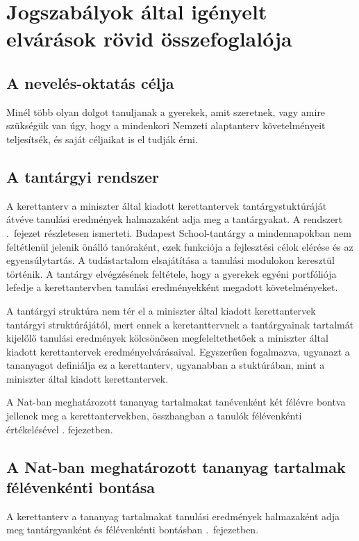 \chapter{Jogszabályok által igényelt elvárások rövid összefoglalója}
\label{sec:jogszabalyok}
\section{A nevelés-oktatás célja}

Minél több olyan dolgot tanuljanak a gyerekek, amit szeretnek, vagy amire szükségük van úgy, hogy a mindenkori Nemzeti alaptanterv követelményeit teljesítsék, és saját céljaikat is el tudják érni.

\section{A tantárgyi rendszer}

A kerettanterv a miniszter által kiadott kerettantervek tantárgystuktúráját átvéve tanulási eredmények halmazaként adja meg a tantárgyakat. A rendszert .~fejezet részletesen ismerteti.  Budapest School-tantárgy a mindennapokban nem feltétlenül jelenik önálló tanóraként, ezek funkciója a fejlesztési célok elérése és az egyensúlytartás. A tudástartalom elsajátítása a tanulási modulokon keresztül történik. A tantárgy elvégzésének feltétele, hogy  a gyerekek egyéni portfóliója lefedje a kerettantervben tanulási eredményekként megadott követelményeket.

A tantárgyi struktúra nem tér el a miniszter által kiadott kerettantervek tantárgyi struktúrájától, mert ennek a keretanttervnek a tantárgyainak tartalmát kijelőlő tanulási eredmények kölcsönösen megfeleltethetőek a miniszter által kiadott kerettantervek eredményelvárásaival. Egyszerűen fogalmazva, ugyanazt a tananyagot definiálja ez a kerettanterv, ugyanabban a stuktúrában, mint a miniszter által kiadott kerettantervek. 

A Nat-ban meghatározott tananyag tartalmakat tanévenként két félévre bontva jellenek meg a kerettantervekben, összhangban a tanulók félévenkénti értékelésével  . fejezetben.

\section{A Nat-ban meghatározott tananyag tartalmak félévenkénti bontása}
A kerettanterv a tananyag tartalmakat tanulási eredmények halmazaként adja meg tantárgyanként és félévenkénti bontásban .~fejezetben. 

